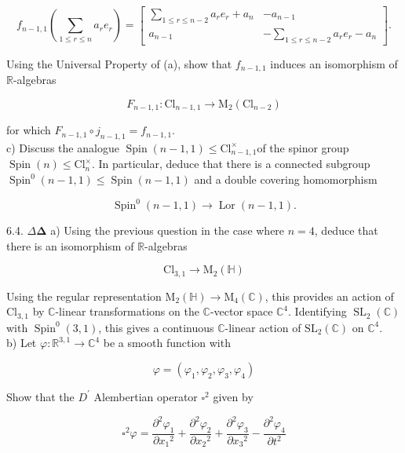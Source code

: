 \documentclass[10pt, letterpaper]{article}
\begin{document}
$$
f_{n-1,1}\left(\sum_{1 \leqslant r \leqslant n} a_{r} e_{r}\right)=\left[\begin{array}{cc}
\sum_{1 \leqslant r \leqslant n-2} a_{r} e_{r}+a_{n} & -a_{n-1} \\
a_{n-1} & -\sum_{1 \leqslant r \leqslant n-2} a_{r} e_{r}-a_{n}
\end{array}\right] .
$$

Using the Universal Property of (a), show that $f_{n-1,1}$ induces an isomorphism of $\mathbb{R}$-algebras

$$
F_{n-1,1}: \mathrm{Cl}_{n-1,1} \longrightarrow \mathrm{M}_{2}\left(\mathrm{Cl}_{n-2}\right)
$$

for which $F_{n-1,1} \circ j_{n-1,1}=f_{n-1,1}$.\\
c) Discuss the analogue $\operatorname{Spin}(n-1,1) \leqslant \mathrm{Cl}_{n-1,1}^{\times}$of the spinor group $\operatorname{Spin}(n) \leqslant \mathrm{Cl}_{n}^{\times}$. In particular, deduce that there is a connected subgroup $\operatorname{Spin}^{0}(n-1,1) \leqslant \operatorname{Spin}(n-1,1)$ and a double covering homomorphism

$$
\operatorname{Spin}^{0}(n-1,1) \longrightarrow \operatorname{Lor}(n-1,1) .
$$

6.4. $\Delta \boldsymbol{\Delta}$ a) Using the previous question in the case where $n=4$, deduce that there is an isomorphism of $\mathbb{R}$-algebras

$$
\mathrm{Cl}_{3,1} \longrightarrow \mathrm{M}_{2}(\mathbb{H})
$$

Using the regular representation $\mathrm{M}_{2}(\mathbb{H}) \longrightarrow \mathrm{M}_{4}(\mathbb{C})$, this provides an action of $\mathrm{Cl}_{3,1}$ by $\mathbb{C}$-linear transformations on the $\mathbb{C}$-vector space $\mathbb{C}^{4}$. Identifying $\operatorname{SL}_{2}(\mathbb{C})$ with $\operatorname{Spin}^{0}(3,1)$, this gives a continuous $\mathbb{C}$-linear action of $\mathrm{SL}_{2}(\mathbb{C})$ on $\mathbb{C}^{4}$.\\
b) Let $\varphi: \mathbb{R}^{3,1} \longrightarrow \mathbb{C}^{4}$ be a smooth function with

$$
\varphi=\left(\varphi_{1}, \varphi_{2}, \varphi_{3}, \varphi_{4}\right)
$$

Show that the $D^{\prime}$ Alembertian operator $\square^{2}$ given by

$$
\square^{2} \varphi=\frac{\partial^{2} \varphi_{1}}{\partial x_{1}{ }^{2}}+\frac{\partial^{2} \varphi_{2}}{\partial x_{2}{ }^{2}}+\frac{\partial^{2} \varphi_{3}}{\partial x_{3}{ }^{2}}-\frac{\partial^{2} \varphi_{4}}{\partial t^{2}}
$$
\end{document}
